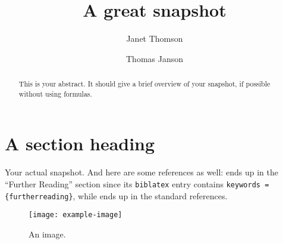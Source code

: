 \documentclass{mfosnapshot}
\author{Janet Thomson \and Thomas Janson}
\title{A great snapshot}
\begin{document}
\begin{abstract}
This is your abstract. It should give a brief overview of your snapshot, if possible without using formulas. 
\end{abstract}

\section{A section heading}
Your actual snapshot. And here are some references as well: \cite{knuth1977fast} ends up in the \enquote{Further Reading} section since its \texttt{biblatex} entry contains \verb!keywords = {furtherreading}!, while \cite{knuth1986texbook} ends up in the standard references.

\begin{figure}[h]
        \centering \texttt{[image: example-image]}
        \caption{An image.}
\label{fig:moon}
\end{figure}
\end{document}
